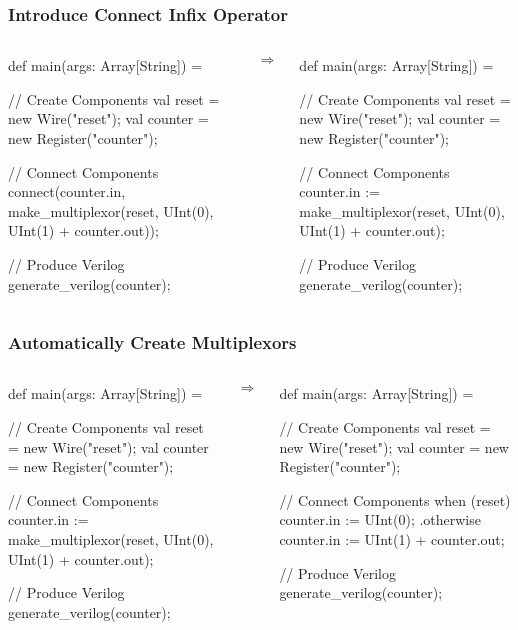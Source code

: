 \begin{frame}[fragile]
\frametitle{Introduce Connect Infix Operator}
\begin{columns}
{
\begin{scala}
def main(args: Array[String]) = {
  // Create Components
  val reset   = new Wire("reset");
  val counter = new Register("counter");

  // Connect Components
  connect(counter.in, 
    make_multiplexor(reset,
      UInt(0),
      UInt(1) + counter.out));

  // Produce Verilog
  generate_verilog(counter);
}
\end{scala}
}
\begin{center}
$\Rightarrow$
\end{center}
{
\begin{scala}
def main(args: Array[String]) = {
  // Create Components
  val reset   = new Wire("reset");
  val counter = new Register("counter");

  // Connect Components
  counter.in :=
    make_multiplexor(reset,
      UInt(0),
      UInt(1) + counter.out);

  // Produce Verilog
  generate_verilog(counter);
}
\end{scala}
}
\end{columns}
\end{frame}

\begin{frame}[fragile]
\frametitle{Automatically Create Multiplexors}
\begin{columns}
{
\begin{scala}
def main(args: Array[String]) = {
  // Create Components
  val reset   = new Wire("reset");
  val counter = new Register("counter");

  // Connect Components
  counter.in :=
    make_multiplexor(reset,
      UInt(0),
      UInt(1) + counter.out);

  // Produce Verilog
  generate_verilog(counter);
}
\end{scala}
}
\begin{center}
$\Rightarrow$
\end{center}
{
\begin{scala}
def main(args: Array[String]) = {
  // Create Components
  val reset   = new Wire("reset");
  val counter = new Register("counter");

  // Connect Components
  when (reset) {
    counter.in := UInt(0);
  } .otherwise {
    counter.in := UInt(1) + counter.out;
  }

  // Produce Verilog
  generate_verilog(counter);
}
\end{scala}
}
\end{columns}
\end{frame}

